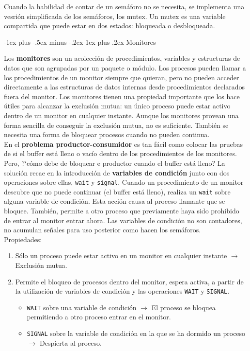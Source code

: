 \documentclass[10pt,portrait, twocolumn]{article}
\makeatletter
\renewcommand{\subsubsection}{\@startsection{subsubsection}{3}{0mm}%
                                {-1ex plus -.5ex minus -.2ex}%
                                {1ex plus .2ex}%
                                {\normalfont\small\bfseries}}
\makeatother
\begin{document}
Cuando la habilidad de contar de un semáforo no se necesita, se implementa una vesrión simplificada de los semáforos, los mutex. Un mutex es una variable compartida que puede estar en dos estados: bloqueada o desbloqueada.

\subsubsection{Monitores}

Los \textbf{monitores} son un acolección de procedimientos, variables y estructuras de datos que son agrupadas por un paquete o módulo. Los procesos pueden llamar a los procedimientos de un monitor siempre que quieran, pero no pueden acceder directamente a las estructuras de datos internas desde procedimientos declarados fuera del monitor. Los monitores tienen una propiedad importante que los hace útiles para alcanzar la exclusión mutua: un único proceso puede estar activo dentro de un monitor en cualquier instante. Aunque los monitores provean una forma sencilla de conseguir la exclusión mutua, no es suficiente. También se necesita una forma de bloquear procesos cuando no pueden continua.\\

En el \textbf{problema productor-consumidor} es tan fácil como colocar las pruebas de si el buffer está lleno o vacío dentro de los procedimientos de los monitores. Pero, ?`cómo debe de bloquear e productor cuando el buffer está lleno?  La solución recae en la introducción de \textbf{variables de condición} junto con dos operaciones sobre ellas, \texttt{wait} y \texttt{signal}. Cuando un procedimiento de un monitor descubre que no puede continuar (el buffer está lleno), realiza un \texttt{wait} sobre alguna variable de condición. Esta acción causa al proceso llamante que se bloquee. También, permite a otro proceso que previamente haya sido prohibido de entrar al monitor entrar ahora. Las variables de condición no son contadores, no acumulan señales para uso posterior como hacen los semáforos. \\

Propiedades:

	\begin{enumerate}
		\item Sólo un proceso puede estar activo en un monitor en cualquier instante $\rightarrow$ Exclusión mutua.
		\item Permite el bloqueo de procesos dentro del monitor, espera activa, a partir de la utilización de variables de condición y las operaciones \texttt{WAIT} y \texttt{SIGNAL}.
			\begin{itemize}
			\item \texttt{WAIT} sobre una variable de condición $\rightarrow$ El proceso se bloquea permitiendo a otro proceso entrar en el monitor.
			\item \texttt{SIGNAL} sobre la variable de condición en la que se ha dormido un proceso $\rightarrow$ Despierta al proceso.
			\end{itemize}
	\end{enumerate}
	
\end{document}
